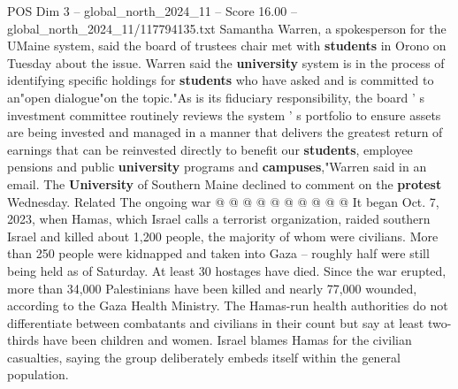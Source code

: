 \begin{textsample}{POS Dim 3 – global\_north\_2024\_11 – Score 16.00 – global\_north\_2024\_11/117794135.txt}
Samantha Warren, a spokesperson for the UMaine system, said the board of trustees chair met with \textbf{students} in Orono on Tuesday about the issue.
Warren said the \textbf{university} system is in the process of identifying specific holdings for \textbf{students} who have asked and is committed to an"open dialogue"on the topic."As is its fiduciary responsibility, the board ' s investment committee routinely reviews the system ' s portfolio to ensure assets are being invested and managed in a manner that delivers the greatest return of earnings that can be reinvested directly to benefit our \textbf{students}, employee pensions and public \textbf{university} programs and \textbf{campuses},"Warren said in an email.
The \textbf{University} of Southern Maine declined to comment on the \textbf{protest} Wednesday.
Related The ongoing war @ @ @ @ @ @ @ @ @ @ It began Oct. 7, 2023, when Hamas, which Israel calls a terrorist organization, raided southern Israel and killed about 1,200 people, the majority of whom were civilians.
More than 250 people were kidnapped and taken into Gaza -- roughly half were still being held as of Saturday.
At least 30 hostages have died.
Since the war erupted, more than 34,000 Palestinians have been killed and nearly 77,000 wounded, according to the Gaza Health Ministry.
The Hamas-run health authorities do not differentiate between combatants and civilians in their count but say at least two-thirds have been children and women.
Israel blames Hamas for the civilian casualties, saying the group deliberately embeds itself within the general population.

\end{textsample}

